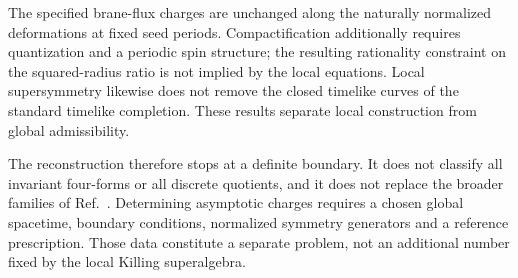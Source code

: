 \documentclass[11pt,a4paper]{article}
\numberwithin{equation}{section}
\begin{document}
The specified brane-flux charges are unchanged along the naturally normalized deformations at fixed seed periods. Compactification additionally requires quantization and a periodic spin structure; the resulting rationality constraint on the squared-radius ratio is not implied by the local equations. Local supersymmetry likewise does not remove the closed timelike curves of the standard timelike completion. These results separate local construction from global admissibility.

The reconstruction therefore stops at a definite boundary. It does not classify all invariant four-forms or all discrete quotients, and it does not replace the broader families of Ref.~\cite{Noris2026}. Determining asymptotic charges requires a chosen global spacetime, boundary conditions, normalized symmetry generators and a reference prescription. Those data constitute a separate problem, not an additional number fixed by the local Killing superalgebra.

\appendix



\end{document}

